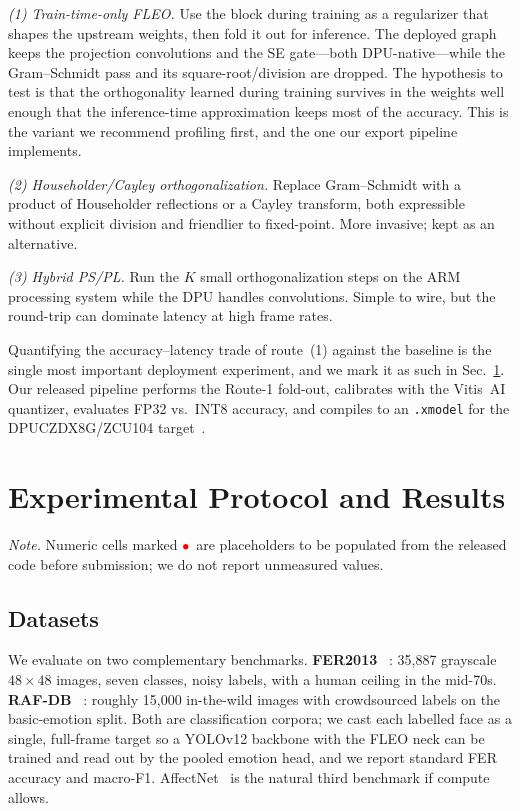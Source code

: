 \documentclass[journal]{IEEEtran}
\newcommand{\pending}{\textcolor{red}{$\bullet$}}
\begin{document}
\emph{(1) Train-time-only FLEO.} Use the block during training as a regularizer
that shapes the upstream weights, then fold it out for inference. The deployed
graph keeps the projection convolutions and the SE gate---both
DPU-native---while the Gram--Schmidt pass and its square-root/division are
dropped. The hypothesis to test is that the orthogonality learned during
training survives in the weights well enough that the inference-time
approximation keeps most of the accuracy. This is the variant we recommend
profiling first, and the one our export pipeline implements.

\emph{(2) Householder/Cayley orthogonalization.} Replace Gram--Schmidt with a
product of Householder reflections or a Cayley transform, both expressible
without explicit division and friendlier to fixed-point. More invasive; kept
as an alternative.

\emph{(3) Hybrid PS/PL.} Run the $K$ small orthogonalization steps on the ARM
processing system while the DPU handles convolutions. Simple to wire, but the
round-trip can dominate latency at high frame rates.

Quantifying the accuracy--latency trade of route~(1) against the baseline is
the single most important deployment experiment, and we mark it as such in
Sec.~\ref{sec:exp}. Our released pipeline performs the Route-1 fold-out,
calibrates with the Vitis~AI quantizer, evaluates FP32 vs.\ INT8 accuracy, and
compiles to an \texttt{.xmodel} for the DPUCZDX8G/ZCU104
target~\cite{vitisai}.

\section{Experimental Protocol and Results}\label{sec:exp}
\textit{Note.} Numeric cells marked \pending\ are placeholders to be populated
from the released code before submission; we do not report unmeasured values.

\subsection{Datasets}
We evaluate on two complementary benchmarks. \textbf{FER2013}~%
\cite{goodfellow2013fer2013}: 35{,}887 grayscale $48\times48$ images, seven
classes, noisy labels, with a human ceiling in the mid-70s. \textbf{RAF-DB}~%
\cite{li2017rafdb}: roughly 15{,}000 in-the-wild images with crowdsourced
labels on the basic-emotion split. Both are classification corpora; we cast
each labelled face as a single, full-frame target so a YOLOv12 backbone with
the FLEO neck can be trained and read out by the pooled emotion head, and we
report standard FER accuracy and macro-F1. AffectNet~\cite{mollahosseini2019affectnet}
is the natural third benchmark if compute allows.
\end{document}
